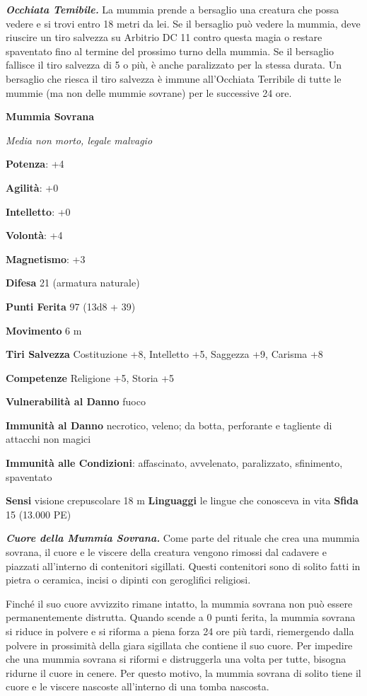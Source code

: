 \begin{multicols}{2}
\emph{\textbf{Occhiata Temibile.}} La mummia prende a bersaglio una
creatura che possa vedere e si trovi entro 18 metri da lei. Se il
bersaglio può vedere la mummia, deve riuscire un tiro salvezza su Arbitrio DC 11 contro questa magia o restare spaventato fino al termine
del prossimo turno della mummia. Se il bersaglio fallisce il tiro
salvezza di 5 o più, è anche paralizzato per la stessa durata. Un
bersaglio che riesca il tiro salvezza è immune all'Occhiata Terribile di
tutte le mummie (ma non delle mummie sovrane) per le successive 24 ore.

\textbf{Mummia Sovrana}

\emph{Media non morto, legale malvagio}

\textbf{Potenza}: +4

\textbf{Agilità}: +0

\textbf{Intelletto}: +0

\textbf{Volontà}: +4

\textbf{Magnetismo}: +3

\textbf{Difesa} 21 (armatura naturale)

\textbf{Punti Ferita} 97 (13d8 + 39)

\textbf{Movimento} 6 m

\textbf{Tiri Salvezza} Costituzione +8, Intelletto +5, Saggezza +9,
Carisma +8

\textbf{Competenze} Religione +5, Storia +5

\textbf{Vulnerabilità al Danno} fuoco

\textbf{Immunità al Danno} necrotico, veleno; da botta, perforante e
tagliente di attacchi non magici

\textbf{Immunità alle Condizioni}: affascinato, avvelenato, paralizzato,
sfinimento, spaventato

\textbf{Sensi} visione crepuscolare 18 m
\textbf{Linguaggi} le lingue che conosceva in vita \textbf{Sfida} 15
(13.000 PE)\smallskip

\emph{\textbf{Cuore della Mummia Sovrana.}} Come parte del rituale che
crea una mummia sovrana, il cuore e le viscere della creatura vengono
rimossi dal cadavere e piazzati all'interno di contenitori sigillati.
Questi contenitori sono di solito fatti in pietra o ceramica, incisi o
dipinti con geroglifici religiosi.

Finché il suo cuore avvizzito rimane intatto, la mummia sovrana non può
essere permanentemente distrutta. Quando scende a 0 punti ferita, la
mummia sovrana si riduce in polvere e si riforma a piena forza 24 ore
più tardi, riemergendo dalla polvere in prossimità della giara sigillata
che contiene il suo cuore. Per impedire che una mummia sovrana si
riformi e distruggerla una volta per tutte, bisogna ridurne il cuore in
cenere. Per questo motivo, la mummia sovrana di solito tiene il cuore e
le viscere nascoste all'interno di una tomba nascosta.


\end{multicols}
